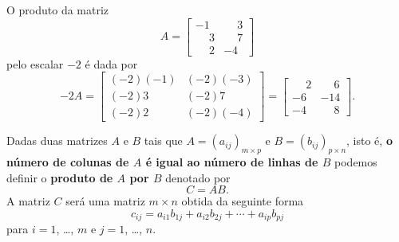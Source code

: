 \documentclass{beamer}
\begin{document}
  \begin{frame}
    \begin{exemplo}
      O produto da matriz
      \[A = \begin{bmatrix}
        -1 & \phantom{-}3\\
        \phantom{-}3 & \phantom{-}7\\
        \phantom{-}2 & -4
      \end{bmatrix}
      \]
      pelo escalar $-2$ é dada por
      \[
        -2A = \begin{bmatrix}
            (-2)(-1) & (-2)(-3)\\
            (-2)3 & (-2)7\\
            (-2)2 & (-2)(-4)
        \end{bmatrix} =
        \begin{bmatrix}
          \phantom{-}2 & \phantom{-}6\\
          -6 & -14\\
          -4 & \phantom{-}8
        \end{bmatrix}.
      \]
    \end{exemplo}
  \end{frame}

  \begin{frame}
    \begin{definicao}
      Dadas duas matrizes $A$ e $B$ tais que $A = (a_{ij})_{m \times p}$ e $B = (b_{ij})_{p \times n}$, isto é,
      \textbf{o número de colunas de $A$ é igual ao número de linhas de $B$} podemos definir o \textbf{produto de $A$ por $B$}
      denotado por
      \[
        C = AB.
      \]
      A matriz $C$ será uma matriz $m \times n$ obtida da seguinte forma
      \begin{equation}\label{multiplicacao_de_matrizes}
        c_{ij} = a_{i1}b_{1j} + a_{i2}b_{2j} + \cdots + a_{ip}b_{pj}
      \end{equation}
      para $i = 1$, \dots, $m$ e $j = 1$, \dots, $n$.
    \end{definicao}
  \end{frame}
\end{document}
